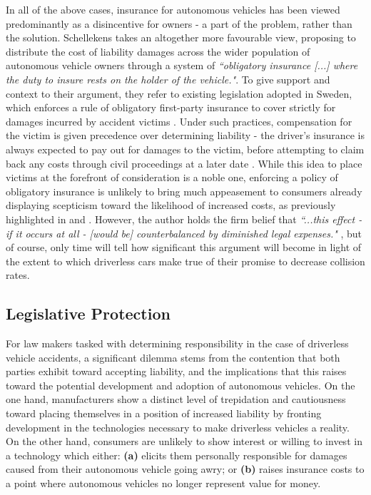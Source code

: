\documentclass[conference]{IEEEtran}
\begin{document}
In all of the above cases, insurance for autonomous vehicles has been viewed predominantly as a disincentive for owners - a part of the problem, rather than the solution. Schellekens \cite{schellekens} takes an altogether more favourable view, proposing to distribute the cost of liability damages across the wider population of autonomous vehicle owners through a system of \textit{``obligatory insurance [...] where the duty to insure rests on the holder of the vehicle."}. To give support and context to their argument, they refer to existing legislation adopted in Sweden, which enforces a rule of obligatory first-party insurance to cover strictly for damages incurred by accident victims \cite{schellekens}. Under such practices, compensation for the victim is given precedence over determining liability \cite{schellekens} - the driver's insurance is always expected to pay out for damages to the victim, before attempting to claim back any costs through civil proceedings at a later date \cite{schellekens}. While this idea to place victims at the forefront of consideration is a noble one, enforcing a policy of obligatory insurance is unlikely to bring much appeasement to consumers already displaying scepticism toward the likelihood of increased costs, as previously highlighted in \cite{marchant, beiker} and \cite{gurney}. However, the author holds the firm belief that \textit{``...this effect - if it occurs at all -  [would be] counterbalanced by diminished legal expenses."} \cite{schellekens}, but of course, only time will tell how significant this argument will become in light of the extent to which driverless cars make true of their promise to decrease collision rates.

\subsection{Legislative Protection}

For law makers tasked with determining responsibility in the case of driverless vehicle accidents, a significant dilemma stems from the contention that both parties exhibit toward accepting liability, and the implications that this raises toward the potential development and adoption of autonomous vehicles. On the one hand, manufacturers show a distinct level of trepidation and cautiousness toward placing themselves in a position of increased liability by fronting  development in the technologies necessary to make driverless vehicles a reality. On the other hand, consumers are unlikely to show interest or willing to invest in a technology which either: \textbf{(a)} elicits them personally responsible for damages caused from their autonomous vehicle going awry; or \textbf{(b)} raises insurance costs to a point where autonomous vehicles no longer represent  value for money.
\end{document}
